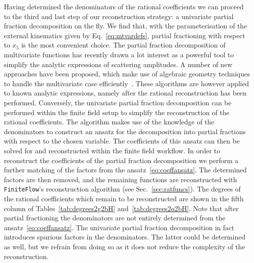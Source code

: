 \documentclass[main.tex]{subfiles}
\begin{document}
Having determined the denominators of the rational coefficients we can proceed to the third and last step of our reconstruction strategy:  a univariate partial fraction decomposition on the fly. We find that, with the parameterisation of the external kinematics given by Eq.~\ref{eq:mtvardefs}, partial fractioning with respect to $x_5$ is the most convenient choice. 
The partial fraction decomposition of multivariate functions has recently drawn a lot interest as a powerful tool to simplify the analytic expressions of scattering amplitudes. A number of new approaches have been proposed, which make use of algebraic geometry techniques to handle the multivariate case efficiently~\cite{Leinartas:1978,Raichev:2012,Abreu:2019odu,Boehm:2020ijp,Heller:2021qkz}. These algorithms are however applied to known analytic expressions, namely after the rational reconstruction has been performed. Conversely, the univariate partial fraction decomposition can be performed within the finite field setup to simplify the reconstruction of the rational coefficients.
The algorithm makes use of the knowledge of the denominators to construct an ansatz for the decomposition into partial fractions with respect to the chosen variable. The coefficients of this ansatz can then be solved for and reconstructed within the finite field workflow. In order to reconstruct the coefficients of the partial fraction decomposition we perform a further matching of the factors from the ansatz~\ref{eq:coeffansatz}. The determined factors are then removed, and the remaining functions are reconstructed with \texttt{FiniteFlow}'s reconstruction algorithm (see Sec.~\ref{sec:ratfuncs}). The degrees of the rational coefficients which remain to be reconstructed are shown in the fifth column of Tables~\ref{tab:degrees2g2bH} and~\ref{tab:degrees2q2bH}. Note that after partial fractioning the denominators are not entirely determined from the ansatz~\ref{eq:coeffansatz}. The univariate partial fraction decomposition in fact introduces spurious factors in the denominators. The latter could be determined as well, but we refrain from doing so as it does not reduce the complexity of the reconstruction.
\end{document}
